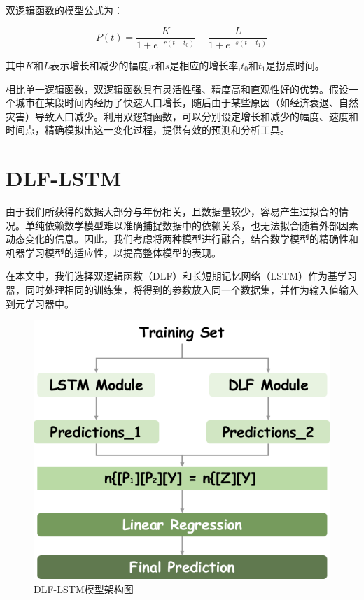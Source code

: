 双逻辑函数的模型公式为：

\begin{equation}
P(t) = \frac{K}{1 + e^{-r(t - t_0)}} + \frac{L}{1 + e^{-s(t - t_1)}}
\end{equation}

其中$K$和$L$表示增长和减少的幅度,$r$和$s$是相应的增长率,$t_0$和$t_1$是拐点时间。

相比单一逻辑函数，双逻辑函数具有灵活性强、精度高和直观性好的优势。假设一个城市在某段时间内经历了快速人口增长，随后由于某些原因（如经济衰退、自然灾害）导致人口减少。利用双逻辑函数，可以分别设定增长和减少的幅度、速度和时间点，精确模拟出这一变化过程，提供有效的预测和分析工具。

\section{DLF-LSTM}
由于我们所获得的数据大部分与年份相关，且数据量较少，容易产生过拟合的情况。单纯依赖数学模型难以准确捕捉数据中的依赖关系，也无法拟合随着外部因素动态变化的信息。因此，我们考虑将两种模型进行融合，结合数学模型的精确性和机器学习模型的适应性，以提高整体模型的表现。

在本文中，我们选择双逻辑函数（DLF）和长短期记忆网络（LSTM）作为基学习器，同时处理相同的训练集，将得到的参数放入同一个数据集，并作为输入值输入到元学习器中。

\begin{figure}[H]
    \centering
    \includegraphics[width=0.45\linewidth]{figures/51.png}
    \caption{DLF-LSTM模型架构图}
    \label{fig:enter-label}
\end{figure}

